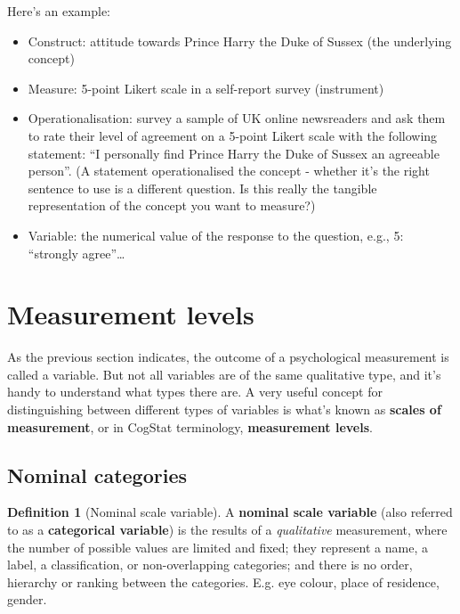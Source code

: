 \documentclass[
  11pt,
]{book}
\providecommand{\tightlist}{%
  \setlength{\itemsep}{0pt}\setlength{\parskip}{0pt}}
\theoremstyle{definition}
\newtheorem{definition}{Definition}[chapter]
\theoremstyle{definition}
\theoremstyle{definition}
\theoremstyle{definition}
\theoremstyle{remark}
\begin{document}
Here's an example:

\begin{itemize}
\tightlist
\item
  Construct: attitude towards Prince Harry the Duke of Sussex (the underlying concept)
\item
  Measure: 5-point Likert scale in a self-report survey (instrument)
\item
  Operationalisation: survey a sample of UK online newsreaders and ask them to rate their level of agreement on a 5-point Likert scale with the following statement: ``I personally find Prince Harry the Duke of Sussex an agreeable person''. (A statement operationalised the concept - whether it's the right sentence to use is a different question. Is this really the tangible representation of the concept you want to measure?)
\item
  Variable: the numerical value of the response to the question, e.g., 5: ``strongly agree''\ldots{}
\end{itemize}

\hypertarget{scales}{%
\section{Measurement levels}\label{scales}}

As the previous section indicates, the outcome of a psychological measurement is called a variable. But not all variables are of the same qualitative type, and it's handy to understand what types there are. A very useful concept for distinguishing between different types of variables is what's known as \textbf{scales of measurement}, or in CogStat terminology, \textbf{measurement levels}.

\hypertarget{nominalscale}{%
\subsection{Nominal categories}\label{nominalscale}}

\begin{definition}[Nominal scale variable]
\protect\hypertarget{def:defnominal}{}\label{def:defnominal}A \textbf{nominal scale variable} (also referred to as a \textbf{categorical variable}) is the results of a \emph{qualitative} measurement, where the number of possible values are limited and fixed; they represent a name, a label, a classification, or non-overlapping categories; and there is no order, hierarchy or ranking between the categories. E.g. eye colour, place of residence, gender.
\end{definition}
\end{document}
